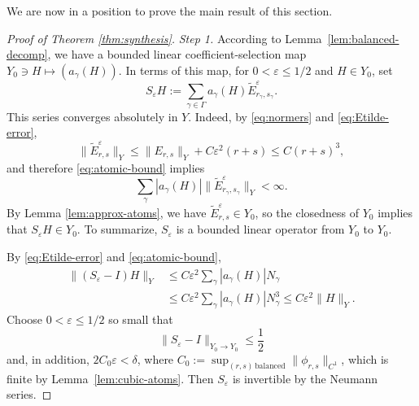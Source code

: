\documentclass[11pt]{amsart}
\theoremstyle{definition}
\theoremstyle{remark}
\begin{document}
We are now in a position to prove the main result of this section.

\begin{proof}[Proof of Theorem \ref{thm:synthesis}]
\emph{Step 1.}
According to Lemma~\ref{lem:balanced-decomp}, we have a bounded linear coefficient-selection map $Y_0\ni H \mapsto (a_\gamma(H))$. In terms of this map, for $0<\varepsilon\leq1/2$ and $H\in Y_0$, set
\begin{equation}\label{eq:S-epsilon}
 S_\varepsilon H
 :=\sum_{\gamma\in\Gamma} a_\gamma(H)
 \widetilde E_{r_\gamma,s_\gamma}^{\varepsilon}.
\end{equation}
This series converges absolutely in $Y$. Indeed, by \eqref{eq:normers} and \eqref{eq:Etilde-error},
\[
 \|\widetilde E_{r,s}^{\varepsilon}\|_Y
 \leq \|E_{r,s}\|_Y+C\varepsilon^2(r+s)
 \leq C(r+s)^3,
\]
and therefore \eqref{eq:atomic-bound} implies
\[
 \sum_\gamma |a_\gamma(H)|
 \|\widetilde E_{r_\gamma,s_\gamma}^{\varepsilon}\|_Y
 <\infty.
\]
By Lemma \ref{lem:approx-atoms}, we have $\widetilde E_{r,s}^{\varepsilon}\in Y_0$, so the closedness of $Y_0$ implies that $S_\varepsilon H\in Y_0$. To summarize, $S_\varepsilon$ is a bounded linear operator from $Y_0$ to $Y_0$.

By \eqref{eq:Etilde-error} and \eqref{eq:atomic-bound},
\begin{align*}
 \|(S_\varepsilon-I)H\|_Y
 &\leq C\varepsilon^2
 \sum_\gamma|a_\gamma(H)|N_\gamma\\
 &\leq C\varepsilon^2
 \sum_\gamma|a_\gamma(H)|N_\gamma^3
 \leq C\varepsilon^2\|H\|_Y.
\end{align*}
Choose $0<\varepsilon\leq1/2$ so small that
\begin{equation}\label{eq:Neumann-small}
 \|S_\varepsilon-I\|_{Y_0\to Y_0} \leq \frac12
\end{equation}
and, in addition, $2C_0\varepsilon<\delta$, where $C_0:= \sup_{(r,s) \,\mathrm{balanced}} \|\phi_{r,s}\|_{C^1}$, which is finite by Lemma~\ref{lem:cubic-atoms}.  Then $S_\varepsilon$ is invertible by the Neumann series.  

\medskip


\end{proof}
\end{document}
